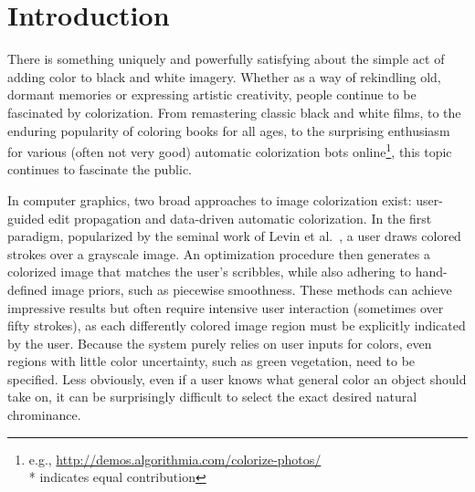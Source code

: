 \documentclass[acmtog,authorversion]{acmart}
\begin{document}



\maketitle

\section{Introduction}

There is something uniquely and powerfully satisfying about the simple act of adding color to black and white imagery. Whether as a way of rekindling old, dormant memories or expressing artistic creativity, people continue to be fascinated by colorization.  From remastering classic black and white films, to the enduring popularity of coloring books for all ages, to the surprising enthusiasm for various (often not very good) automatic colorization bots online\footnote{e.g., \url{http://demos.algorithmia.com/colorize-photos/} \\ * indicates equal contribution}, this topic continues to fascinate the public. 

In computer graphics, two broad approaches to image colorization exist: user-guided edit propagation and data-driven automatic colorization. In the first paradigm, popularized by the seminal work of Levin et al.~, a user draws colored strokes over a grayscale image. An optimization procedure then generates a colorized image that matches the user's scribbles, while also adhering to hand-defined image priors, such as piecewise smoothness. These methods can achieve impressive results but often require intensive user interaction (sometimes over fifty strokes), as each differently colored image region must be explicitly indicated by the user. Because the system purely relies on user inputs for colors, even regions with little color uncertainty, such as green vegetation, need to be specified. Less obviously, even if a user knows what general color an object should take on, it can be surprisingly difficult to select the exact desired natural chrominance.
\end{document}
